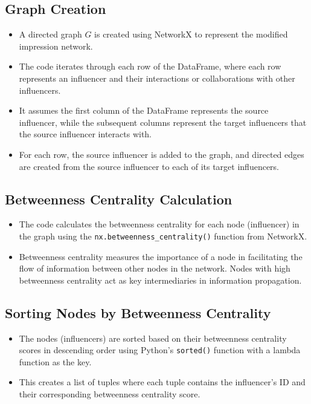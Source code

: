 \documentclass{article}
\begin{document}
\subsection{Graph Creation}
\begin{itemize}
    \item A directed graph $G$ is created using NetworkX to represent the modified impression network.
    \item The code iterates through each row of the DataFrame, where each row represents an influencer and their interactions or collaborations with other influencers.
    \item It assumes the first column of the DataFrame represents the source influencer, while the subsequent columns represent the target influencers that the source influencer interacts with.
    \item For each row, the source influencer is added to the graph, and directed edges are created from the source influencer to each of its target influencers.
\end{itemize}

\subsection{Betweenness Centrality Calculation}
\begin{itemize}
    \item The code calculates the betweenness centrality for each node (influencer) in the graph using the \texttt{nx.betweenness\_centrality()} function from NetworkX.
    \item Betweenness centrality measures the importance of a node in facilitating the flow of information between other nodes in the network. Nodes with high betweenness centrality act as key intermediaries in information propagation.
\end{itemize}

\subsection{Sorting Nodes by Betweenness Centrality}
\begin{itemize}
    \item The nodes (influencers) are sorted based on their betweenness centrality scores in descending order using Python's \texttt{sorted()} function with a lambda function as the key.
    \item This creates a list of tuples where each tuple contains the influencer's ID and their corresponding betweenness centrality score.
\end{itemize}
\end{document}
